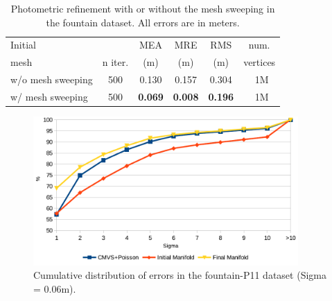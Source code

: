 \begin{table}[t]
\caption{Photometric refinement with or without the mesh sweeping  in the fountain dataset. All errors are in meters.}
\label{tab:resFountPhoto}
\setlength{\tabcolsep}{4px}
\normalsize
\centering
\begin{tabular}{lccccc}
\toprule 
Initial & & MEA & MRE & RMS & num. \\
mesh & n iter. & (m) & (m) & (m) & vertices \\
\midrule
w/o mesh sweeping &500& 0.130 & 0.157 & 0.304 & ~1M\\
w/ mesh sweeping &500& \textbf{0.069} & \textbf{0.008} & \textbf{0.196} & ~1M\\
\end{tabular}
\end{table}




\begin{figure}[t]
\centering
\includegraphics[width=0.9\textwidth]{./img/hist}
\caption{Cumulative distribution of errors in the fountain-P11 dataset (Sigma = 0.06m).}
\label{fig:fountainhist}
\end{figure}


